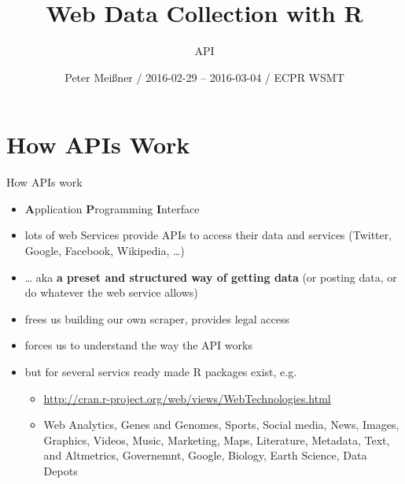 \documentclass[ignorenonframetext,]{beamer}
\title{Web Data Collection with R}
\subtitle{API}
\author{Peter Meißner / 2016-02-29 -- 2016-03-04 / ECPR WSMT}
\date{}
\providecommand{\tightlist}{%
  \setlength{\itemsep}{0pt}\setlength{\parskip}{0pt}}
\begin{document}
\frame{\titlepage}

\begin{frame}
\tableofcontents[hideallsubsections]
\end{frame}

\section{How APIs Work}\label{how-apis-work}

\begin{frame}{How APIs work}

\begin{itemize}
\tightlist
\item
  \textbf{A}pplication \textbf{P}rogramming \textbf{I}nterface
\item
  lots of web Services provide APIs to access their data and services
  (Twitter, Google, Facebook, Wikipedia, \ldots{})
\item
  \ldots{} aka \textbf{a preset and structured way of getting data} (or
  posting data, or do whatever the web service allows)
\item
  frees us building our own scraper, provides legal access
\item
  forces us to understand the way the API works
\item
  but for several servics ready made R packages exist, e.g.

  \begin{itemize}
  \tightlist
  \item
    \url{http://cran.r-project.org/web/views/WebTechnologies.html}
  \item
    Web Analytics, Genes and Genomes, Sports, Social media, News,
    Images, Graphics, Videos, Music, Marketing, Maps, Literature,
    Metadata, Text, and Altmetrics, Governemnt, Google, Biology, Earth
    Science, Data Depots
  \end{itemize}
\end{itemize}

\end{frame}
\end{document}
